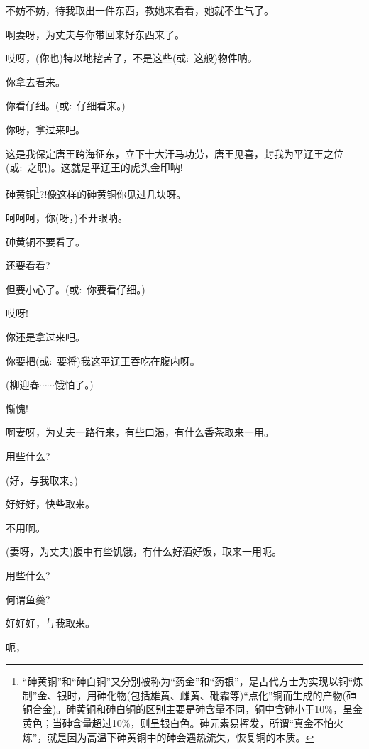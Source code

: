 {{不妨不妨，待我取出一件东西，教她来看看，她就不生气了。

啊妻呀，为丈夫与你带回来好东西来了。

哎呀，(你也)特以地挖苦了，不是这些({\akai 或}:~这般)物件呐。

你拿去看来。

你看仔细。({\akai 或}:~仔细看来。)

你呀，拿过来吧。

这是我保定唐王跨海征东，立下十大汗马功劳，唐王见喜，封我为平辽王之位({\akai 或}:~之职)。这就是平辽王的虎头金印呐!

砷黄铜\footnote{``砷黄铜''和``砷白铜''又分别被称为``药金''和``药银''，是古代方士为实现以铜``炼制''金、银时，用砷化物(包括雄黄、雌黄、砒霜等)``点化''铜而生成的产物(砷铜合金)。砷黄铜和砷白铜的区别主要是砷含量不同，铜中含砷小于10\%，呈金黄色；当砷含量超过10\%，则呈银白色。砷元素易挥发，所谓``真金不怕火炼''，就是因为高温下砷黄铜中的砷会遇热流失，恢复铜的本质。}?!像这样的砷黄铜你见过几块呀。

呵呵呵，你(呀，)不开眼呐。

砷黄铜不要看了。

还要看看?

但要小心了。({\akai 或}:~你要看仔细。)

哎呀!

你还是拿过来吧。

你要把({\akai 或}:~要将)我这平辽王吞吃在腹内呀。

(柳迎春\hspace{20pt}$\cdots{}\cdots{}$饿怕了。)

惭愧!

啊妻呀，为丈夫一路行来，有些口渴，有什么香茶取来一用。

用些什么?

(好，与我取来。)

好好好，快些取来。


不用啊。

(妻呀，为丈夫)腹中有些饥饿，有什么好酒好饭，取来一用呃。

用些什么?

何谓鱼羹?

好好好，与我取来。


呃，


}}
